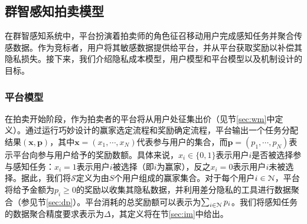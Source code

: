 	
	
	\vspace{-0.1cm}
	\subsection{群智感知拍卖模型}\label{sec:pc1}
	
	在群智感知系统中，平台扮演着拍卖师的角色征召移动用户完成感知任务并聚合传感数据。作为竞标者，用户将其敏感数据提供给平台，并从平台获取奖励以补偿其隐私损失。接下来，我们介绍隐私成本模型，用户模型和平台模型以及机制设计的目标。
	
	\subsubsection{平台模型}
	在拍卖开始阶段，作为拍卖者的平台将从用户处征集出价（见节\ref{sec:wm}中定义）。通过运行巧妙设计的赢家选定流程和奖励确定流程，平台输出一个任务分配结果$(\mathbf{x},\mathbf{p})$，其中$\mathbf{x}=(x_{1},\cdots,x_{N})$代表参与用户的集合，而$\mathbf{p}=(p_{1},\cdots,p_{N})$表示平台向参与用户给予的奖励数额。具体来说，$x_i\in\{0,1\}$表示用户$i$是否被选择参与感知任务：$x_i=1$表示用户$i$被选择（即$i$为赢家），反之$x_i=0$表示用户$i$未被选择。据此，我们将$\mathcal{S}$定义为由$S$个用户组成的赢家集合。对于每个用户$i\in\mathcal{N}$，平台将给予金额为$p_{i}\ge0$的奖励以收集其隐私数据，并利用差分隐私的工具进行数据聚合（参见节\ref{sec:dp}）。平台消耗的总奖励额可以表示为$\sum_{i\in\mathcal{N}}p_i$。我们将感知任务的数据聚合精度要求表示为$\Delta$，其定义将在节\ref{sec:im}中给出。
	

